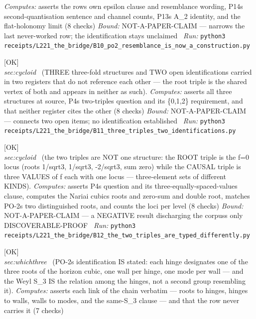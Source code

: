 \begin{description}
\emph{Computes:} asserts the rows own epsilon clause and resemblance wording, P14s second-quantisation sentence and channel counts, P13s A\_2 identity, and the flat-holonomy limit (8 checks)
 \emph{Bound:} NOT-A-PAPER-CLAIM --- narrows the last never-worked row; the identification stays unclaimed
\ \emph{Run:} \texttt{python3 receipts/L221\_the\_bridge/B10\_po2\_resemblance\_is\_now\_a\_construction.py}
\item[\label{rcpt:B11_three_triples_two_identifications}\texttt{B11\_three\_triples\_two\_identifications}]\hfill\textsf{[OK]}\\
\textit{sec:cycloid} \ (THREE three-fold structures and TWO open identifications carried in two registers that do not reference each other --- the root triple is the shared vertex of both and appears in neither as such). 
\emph{Computes:} asserts all three structures at source, P4s two-triples question and its \{0,1,2\} requirement, and that neither register cites the other (8 checks)
 \emph{Bound:} NOT-A-PAPER-CLAIM --- connects two open items; no identification established
\ \emph{Run:} \texttt{python3 receipts/L221\_the\_bridge/B11\_three\_triples\_two\_identifications.py}
\item[\label{rcpt:B12_the_two_triples_are_typed_differently}\texttt{B12\_the\_two\_triples\_are\_typed\_differently}]\hfill\textsf{[OK]}\\
\textit{sec:cycloid} \ (the two triples are NOT one structure: the ROOT triple is the f=0 locus (roots 1/sqrt3, 1/sqrt3, -2/sqrt3, sum zero) while the CAUSAL triple is three VALUES of f each with one locus --- three-element sets of different KINDS). 
\emph{Computes:} asserts P4s question and its three-equally-spaced-values clause, computes the Nariai cubics roots and zero-sum and double root, matches PO-2s two distinguished roots, and counts the loci per level (8 checks)
 \emph{Bound:} NOT-A-PAPER-CLAIM --- a NEGATIVE result discharging the corpuss only DISCOVERABLE-PROOF
\ \emph{Run:} \texttt{python3 receipts/L221\_the\_bridge/B12\_the\_two\_triples\_are\_typed\_differently.py}
\item[\label{rcpt:B13_po2_identification_is_stated}\texttt{B13\_po2\_identification\_is\_stated}]\hfill\textsf{[OK]}\\
\textit{sec:whichthree} \ (PO-2s identification IS stated: each hinge designates one of the three roots of the horizon cubic, one wall per hinge, one mode per wall --- and the Weyl S\_3 IS the relation among the hinges, not a second group resembling it). 
\emph{Computes:} asserts each link of the chain verbatim --- roots to hinges, hinges to walls, walls to modes, and the same-S\_3 clause --- and that the row never carries it (7 checks)

\end{description}
